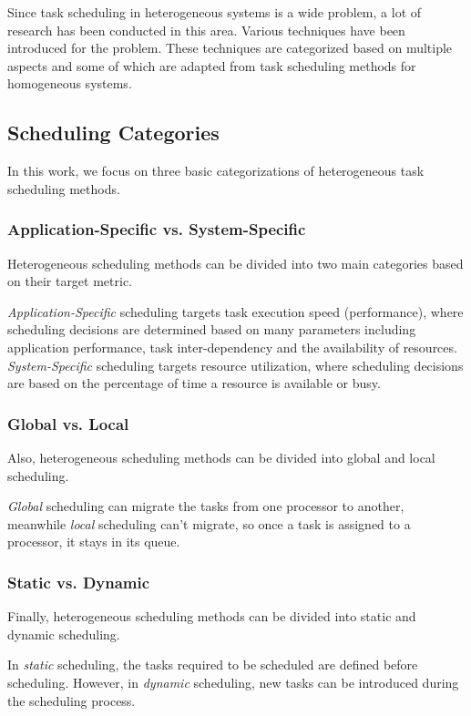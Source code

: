 Since task scheduling in heterogeneous systems is a wide problem, a lot of research has been conducted in this area. Various techniques have been introduced for the problem. These techniques are categorized based on multiple aspects \cite{inbook} and some of which are adapted from task scheduling methods for homogeneous systems.

\subsection{Scheduling Categories}
In this work, we focus on three basic categorizations of heterogeneous task scheduling methods. \\

\subsubsection{Application-Specific vs. System-Specific}
Heterogeneous scheduling methods can be divided into two main categories based on their target metric.

\emph{Application-Specific} scheduling targets task execution speed (performance), where scheduling
decisions are determined based on many parameters including application performance, task inter-dependency and the availability of resources. \emph{System-Specific} scheduling targets resource utilization, where scheduling decisions are based on the percentage of time a resource is available or busy. \\

\subsubsection{Global vs. Local}
Also, heterogeneous scheduling methods can be divided into global and local scheduling.

\emph{Global} scheduling can migrate the tasks from one processor to another, meanwhile \emph{local} scheduling can't migrate, so once a task is assigned to a processor, it stays in its queue.  \\

\subsubsection{Static vs. Dynamic}
Finally, heterogeneous scheduling methods can be divided into static and dynamic scheduling. 

In \emph{static} scheduling, the tasks required to be scheduled are defined before scheduling. However, in \emph{dynamic} scheduling, new tasks can be introduced during the scheduling process.

